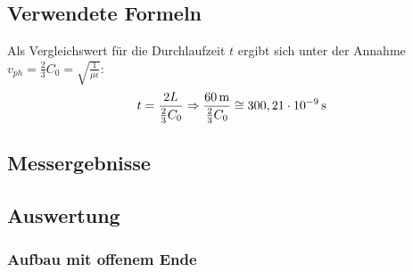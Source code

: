 \documentclass[12pt,a4paper]{article}
\begin{document}
\subsection{Verwendete Formeln}
Als Vergleichswert für die Durchlaufzeit $t$ ergibt sich unter der Annahme $v_{ph} = \frac{2}{3}C_0 = \sqrt{\frac{1}{\mu\epsilon}}$:
\begin{align}
t=\frac{2 L}{\frac{2}{3}C_0} \Rightarrow \frac{\unit[60]{m}}{\frac{2}{3}C_0} \cong \unit[300,21\cdot10^{-9}]{s}
\end{align}
\subsection{Messergebnisse}
\subsection{Auswertung}

\subsubsection{Aufbau mit offenem Ende}
\end{document}
